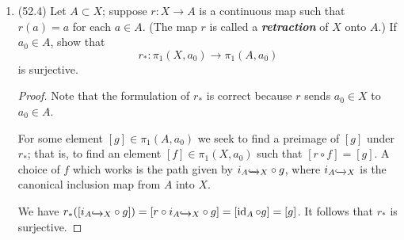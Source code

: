 \documentclass[11pt]{article}
\DeclareMathOperator{\id}{id}
\begin{document}
\begin{enumerate}
\begin{proof}
        Let $\alpha,\beta$ be any two paths from $x_0$ to $x_1$. For elements $[\overline{\alpha}\ast \beta],[\overline{\alpha}\ast f\ast \alpha]\in \pi_1(X,x_1)$, we have \begin{align*}
            \hat{\alpha}([f]) = [\overline{\alpha}]\ast[f]\ast[\alpha] = [\overline{\alpha}\ast f\ast \alpha] &= [\overline{\alpha}\ast \beta]^{-1}\ast [\overline{\alpha}\ast f\ast \alpha]\ast [\overline{\alpha}\ast \beta]\\
            &=[\overline{\beta}]\ast[\alpha]\ast[\overline{\alpha}]\ast [f]\ast[\alpha]\ast[\overline{\alpha}]\ast [\beta]\\
            &= [\overline{\beta}]\ast [f]\ast [\beta] = \hat{\beta}([f]),
        \end{align*} as desired.
    \end{proof}
    \item (52.4) Let $A\subset X$; suppose $r\colon X\to A$ is a continuous map such that $r(a) = a$ for each $a\in A$. (The map $r$ is called a \textbf{\textit{retraction}} of $X$ onto $A$.) If $a_0\in A$, show that \[r_\ast \colon \pi_1(X,a_0)\to \pi_1(A,a_0)\] is surjective.
    \begin{proof} Note that the formulation of $r_\ast$ is correct because $r$ sends $a_0\in X$ to $a_0\in A$.

        For some element $[g]\in \pi_1(A,a_0)$ we seek to find a preimage of $[g]$ under $r_\ast$; that is, to find an element $[f]\in \pi_1(X,a_0)$ such that $[r\circ f] = [g]$. A choice of $f$ which works is the path given by $i_{A\xhookrightarrow{} X}\circ g$, where $i_{A\xhookrightarrow{} X}$ is the canonical inclusion map from $A$ into $X$.

        We have $r_\ast([i_{A\xhookrightarrow{} X}\circ g]) = [r\circ i_{A\xhookrightarrow{} X}\circ g] = [\id_A\circ g] = [g]$. It follows that $r_\ast$ is surjective. 


\end{proof}
\end{enumerate}
\end{document}
